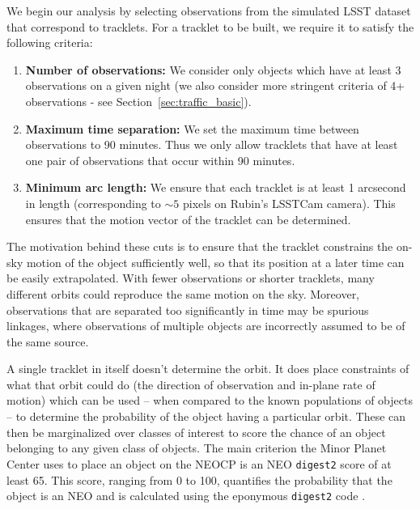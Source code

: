 \documentclass[twocolumn]{aastex631}
\newcommand{\dig}{\texttt{digest2}}
\begin{document}
We begin our analysis by selecting observations from the simulated LSST dataset that correspond to tracklets. For a tracklet to be built, we require it to satisfy the following criteria:
\begin{enumerate}
    \item \textbf{Number of observations:} We consider only objects which have at least 3 observations on a given night (we also consider more stringent criteria of 4+ observations - see Section~\ref{sec:traffic_basic}).
    \item \textbf{Maximum time separation:} We set the maximum time between observations to 90 minutes. Thus we only allow tracklets that have at least one pair of observations that occur within 90 minutes.
    \item \textbf{Minimum arc length:} We ensure that each tracklet is at least 1 arcsecond in length (corresponding to ${\sim}5$ pixels on Rubin's LSSTCam camera). This ensures that the motion vector of the tracklet can be determined.
\end{enumerate}
The motivation behind these cuts is to ensure that the tracklet constrains the on-sky motion of the object sufficiently well, so that its position at a later time can be easily extrapolated. With fewer observations or shorter tracklets, many different orbits could reproduce the same motion on the sky. Moreover, observations that are separated too significantly in time may be spurious linkages, where observations of multiple objects are incorrectly assumed to be of the same source.

A single tracklet in itself doesn't determine the orbit. It does place constraints of what that orbit could do (the direction of observation and in-plane rate of motion) which can be used -- when compared to the known populations of objects -- to determine the probability of the object having a particular orbit. These can then be marginalized over classes of interest to score the chance of an object belonging to any given class of objects. The main criterion the Minor Planet Center uses to place an object on the NEOCP is an NEO \dig{} score of at least 65. This score, ranging from 0 to 100, quantifies the probability that the object is an NEO and is calculated using the eponymous \dig{} code \citep{Keys+2019}.
\end{document}
